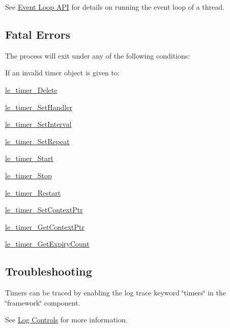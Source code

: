 See \hyperlink{c_eventLoop}{Event Loop A\+P\+I} for details on running the event loop of a thread.\hypertarget{c_timer_timer_errors}{}\subsection{Fatal Errors}\label{c_timer_timer_errors}
The process will exit under any of the following conditions\+:
\begin{DoxyItemize}
\item If an invalid timer object is given to\+:
\begin{DoxyItemize}
\item \hyperlink{le__timer_8h_ae103f6736bf855e77e5e59bbad1e27a7}{le\+\_\+timer\+\_\+\+Delete}
\item \hyperlink{le__timer_8h_abbf8d4c3c78d7bf5801b94071adcb6c6}{le\+\_\+timer\+\_\+\+Set\+Handler}
\item \hyperlink{le__timer_8h_a0a103d5cef5e83fc9088859d527bbd43}{le\+\_\+timer\+\_\+\+Set\+Interval}
\item \hyperlink{le__timer_8h_a292b0a7d6dc0796a36a54fd04c6a7eeb}{le\+\_\+timer\+\_\+\+Set\+Repeat}
\item \hyperlink{le__timer_8h_ada2ce7f8cb1e76ed959e323ae94bbfc0}{le\+\_\+timer\+\_\+\+Start}
\item \hyperlink{le__timer_8h_af310daa378bd6ca39373a47e073f2243}{le\+\_\+timer\+\_\+\+Stop}
\item \hyperlink{le__timer_8h_ab6b83d6302095a46b6046160c0a479bb}{le\+\_\+timer\+\_\+\+Restart}
\item \hyperlink{le__timer_8h_af6900bdb4653ff95f7f7be918b9e482d}{le\+\_\+timer\+\_\+\+Set\+Context\+Ptr}
\item \hyperlink{le__timer_8h_aa0432dbabb32b546c0c0e6ced5ba9d3d}{le\+\_\+timer\+\_\+\+Get\+Context\+Ptr}
\item \hyperlink{le__timer_8h_a554cff1d11525bb60115291248f3ff53}{le\+\_\+timer\+\_\+\+Get\+Expiry\+Count}
\end{DoxyItemize}
\end{DoxyItemize}\hypertarget{c_timer_timer_troubleshooting}{}\subsection{Troubleshooting}\label{c_timer_timer_troubleshooting}
Timers can be traced by enabling the log trace keyword \char`\"{}timers\char`\"{} in the \char`\"{}framework\char`\"{} component.

See \hyperlink{c_logging_c_log_controlling}{Log Controls} for more information.





